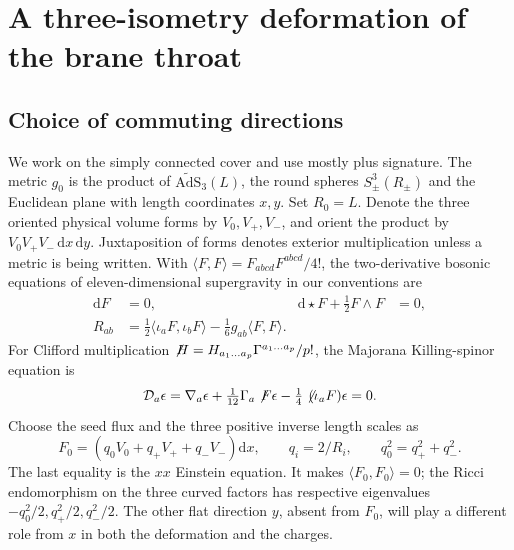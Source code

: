 \documentclass[11pt,a4paper]{article}
\numberwithin{equation}{section}
\newcommand{\AdS}{\mathrm{AdS}}
\newcommand{\dd}{\mathrm{d}}
\begin{document}
\section{A three-isometry deformation of the brane throat}\label{sec:fields}

\subsection{Choice of commuting directions}

We work on the simply connected cover and use mostly plus signature. The metric $g_0$ is the product of $\widetilde{\AdS}_3(L)$, the round spheres $S^3_\pm(R_\pm)$ and the Euclidean plane with length coordinates $x,y$. Set $R_0=L$. Denote the three oriented physical volume forms by $V_0,V_+,V_-$, and orient the product by $V_0V_+V_-\,\dd x\,\dd y$. Juxtaposition of forms denotes exterior multiplication unless a metric is being written. With $\langle F,F\rangle=F_{abcd}F^{abcd}/4!$, the two-derivative bosonic equations of eleven-dimensional supergravity \cite{CJS} in our conventions are
\begin{align}
 \dd F&=0, & \dd\star F+\tfrac12 F\wedge F&=0,\nonumber\\
 R_{ab}&=\tfrac12\langle\iota_a F,\iota_b F\rangle-\tfrac16 g_{ab}\langle F,F\rangle .\label{eq:eom}
\end{align}
For Clifford multiplication $\not\!H=H_{a_1\ldots a_p}\Gamma^{a_1\ldots a_p}/p!$, the Majorana Killing-spinor equation is
\begin{equation}
 \mathcal D_a\epsilon=\nabla_a\epsilon+\tfrac1{12}\Gamma_a\not\!F\epsilon-\tfrac14\not\!{(\iota_a F)}\epsilon=0 .\label{eq:kse}
\end{equation}
Choose the seed flux and the three positive inverse length scales as
\begin{equation}
 F_0=(q_0 V_0+q_+V_++q_-V_-)\dd x,\qquad q_i=2/R_i,\qquad q_0^2=q_+^2+q_-^2 .\label{eq:seed}
\end{equation}
The last equality is the $xx$ Einstein equation. It makes $\langle F_0,F_0\rangle=0$; the Ricci endomorphism on the three curved factors has respective eigenvalues $-q_0^2/2,q_+^2/2,q_-^2/2$. The other flat direction $y$, absent from $F_0$, will play a different role from $x$ in both the deformation and the charges.
\end{document}
